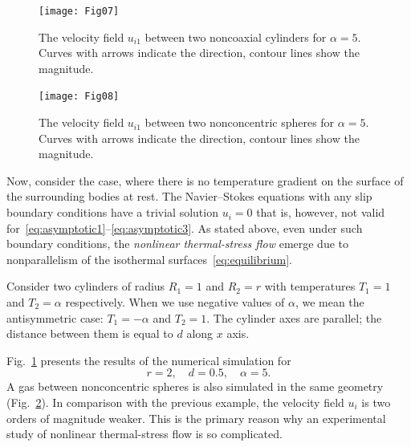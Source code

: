 \documentclass[smallextended, referee]{svjour3} %
\begin{document}
\begin{figure}
    \centering
    \texttt{[image: Fig07]}
    \caption{The velocity field \(u_{i1}\) between two noncoaxial cylinders for \(\alpha=5\).
        Curves with arrows indicate the direction, contour lines show the magnitude.}
    \label{fig:cylinders}
\end{figure}

\begin{figure}
    \centering
    \texttt{[image: Fig08]}
    \caption{The velocity field \(u_{i1}\) between two nonconcentric spheres for \(\alpha=5\).
        Curves with arrows indicate the direction, contour lines show the magnitude.}
    \label{fig:spheres}
\end{figure}

Now, consider the case, where there is no temperature gradient on the surface of the surrounding bodies at rest.
The Navier--Stokes equations with any slip boundary conditions have a trivial solution \(u_i = 0\)
that is, however, not valid for~\eqref{eq:asymptotic1}--\eqref{eq:asymptotic3}.
As stated above, even under such boundary conditions, the \emph{nonlinear thermal-stress flow} emerge
due to nonparallelism of the isothermal surfaces~\eqref{eq:equilibrium}.

Consider two cylinders of radius \(R_1 = 1\) and \(R_2 = r\)
with temperatures \(T_1 = 1\) and \(T_2 = \alpha\) respectively.
When we use negative values of \(\alpha\), we mean the antisymmetric case: \(T_1 = -\alpha\) and \(T_2 = 1\).
The cylinder axes are parallel; the distance between them is equal to \(d\) along \(x\) axis.

Fig.~\ref{fig:cylinders} presents the results of the numerical simulation for
\[ r = 2, \quad d = 0.5, \quad \alpha = 5. \]
A gas between nonconcentric spheres is also simulated in the same geometry (Fig.~\ref{fig:spheres}).
In comparison with the previous example, the velocity field \(u_i\) is two orders of magnitude weaker.
This is the primary reason why an experimental study of nonlinear thermal-stress flow is so complicated.
\end{document}
